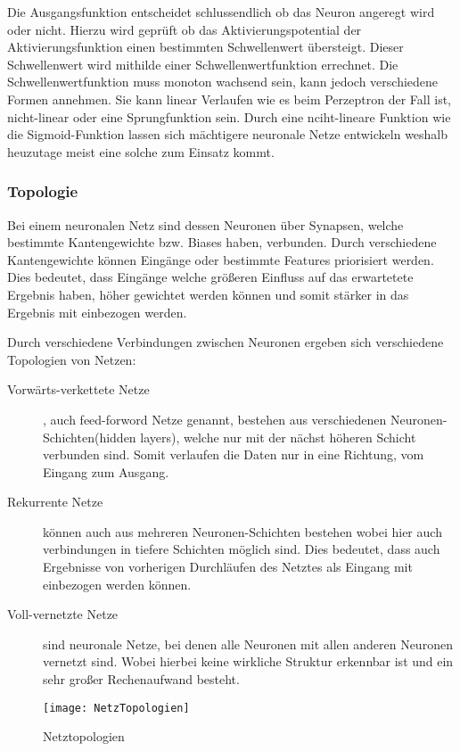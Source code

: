     \noindent
    Die Ausgangsfunktion entscheidet schlussendlich ob das Neuron angeregt wird oder nicht.
    Hierzu wird geprüft ob das Aktivierungspotential der Aktivierungsfunktion einen bestimmten Schwellenwert übersteigt.
    Dieser Schwellenwert wird mithilde einer Schwellenwertfunktion errechnet. 
    Die Schwellenwertfunktion muss monoton wachsend sein, kann jedoch verschiedene Formen annehmen. 
    Sie kann linear Verlaufen wie es beim Perzeptron der Fall ist, nicht-linear oder eine Sprungfunktion sein. 
    Durch eine nciht-lineare Funktion wie die Sigmoid-Funktion lassen sich mächtigere neuronale Netze entwickeln weshalb heuzutage meist eine solche zum Einsatz kommt.


    \subsubsection{Topologie}
    Bei einem neuronalen Netz sind dessen Neuronen über Synapsen, welche bestimmte Kantengewichte bzw. Biases haben, verbunden.
    Durch verschiedene Kantengewichte können Eingänge oder bestimmte Features priorisiert werden. 
    Dies bedeutet, dass Eingänge welche größeren Einfluss auf das erwartetete Ergebnis haben, höher gewichtet werden können und somit stärker in das Ergebnis mit einbezogen werden.
    \newline

    \noindent
    Durch verschiedene Verbindungen zwischen Neuronen ergeben sich verschiedene Topologien von Netzen:
    \begin{description}
        \item[Vorwärts-verkettete Netze], auch feed-forword Netze genannt, bestehen aus verschiedenen Neuronen-Schichten(hidden layers), welche nur mit der nächst höheren Schicht verbunden sind. Somit verlaufen die Daten nur in eine Richtung, vom Eingang zum Ausgang.
        \item[Rekurrente Netze] können auch aus mehreren Neuronen-Schichten bestehen wobei hier auch verbindungen in tiefere Schichten möglich sind. Dies bedeutet, dass auch Ergebnisse von vorherigen Durchläufen des Netztes als Eingang mit einbezogen werden können.
        \item[Voll-vernetzte Netze] sind neuronale Netze, bei denen alle Neuronen mit allen anderen Neuronen vernetzt sind. Wobei hierbei keine wirkliche Struktur erkennbar ist und ein sehr großer Rechenaufwand besteht.
    \end{description}

    \begin{figure}[H]
        \centering
        \texttt{[image: NetzTopologien]}
        \caption{Netztopologien}
        \label{fig:NetzTopologien}
    \end{figure}


